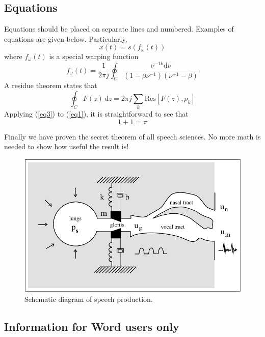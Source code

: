 \documentclass[a4paper]{article}
\begin{document}
\subsection{Equations}

Equations should be placed on separate lines and numbered. Examples of equations are given below. Particularly,
% 
\begin{equation}
  x(t) = s(f_\omega(t))
  \label{eq1}
\end{equation}
% 
where \(f_\omega(t)\) is a special warping function
% 
\begin{equation}
  f_\omega(t) = \frac{1}{2 \pi j} \oint_C 
  \frac{\nu^{-1k} \mathrm{d} \nu}
  {(1-\beta\nu^{-1})(\nu^{-1}-\beta)}
  \label{eq2}
\end{equation}
% 
A residue theorem states that
% 
\begin{equation}
  \oint_C F(z)\,\mathrm{d}z = 2 \pi j \sum_k \mathrm{Res}[F(z),p_k]
  \label{eq3}
\end{equation}
% 
Applying (\ref{eq3}) to (\ref{eq1}), it is straightforward to see that
% 
\begin{equation}
  1 + 1 = \pi
  \label{eq4}
\end{equation}

Finally we have proven the secret theorem of all speech sciences. No more math is needed to show how useful the result is!

\begin{figure}[t]
  \centering
  \includegraphics[width=\linewidth]{figure.pdf}
  \caption{Schematic diagram of speech production.}
  \label{fig:speech_production}
\end{figure}

\subsection{Information for Word users only}
\end{document}
